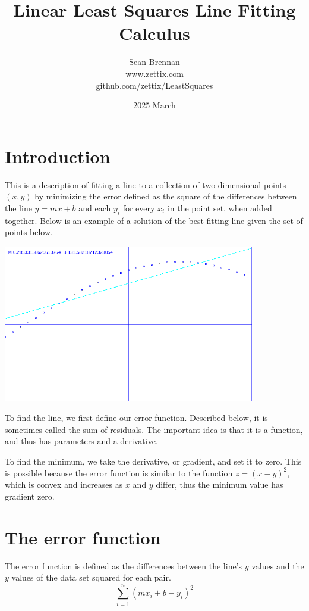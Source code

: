 \documentclass{article}
\title{Linear Least Squares Line Fitting Calculus}
\date{2025 March}
\author{Sean Brennan \\ www.zettix.com \\ github.com/zettix/LeastSquares}
\begin{document}
\maketitle


\section{Introduction}
This is a description of fitting a line to a collection of
two dimensional points $(x,y)$ by minimizing the error defined
as the square of the differences between the line $y = mx + b$ and each $y_i$ for every $x_i$ in the point set, when added together.  Below is an example of
a solution of the best fitting line given the set of points below.

\includegraphics[width=110mm]{whiteplot.png}

To find the line, we first define our error function. Described below,
it is sometimes called the sum of residuals. The important idea is that
it is a function, and thus has parameters and a derivative.

To find the minimum, we take the derivative, or gradient, and set it to zero.
This is possible because the error function is similar to the function
$z = (x - y)^2$, which is convex and increases as $x$ and $y$ differ,
thus the minimum value has gradient zero.

\section{The error function}

The error function is defined as the differences between
the line's $y$ values and the $y$ values of the data set squared for each pair.
\begin{equation}
\sum_{i=1}^{n}\left(m x_i + b - y_i\right)^2
\end{equation}
\end{document}
